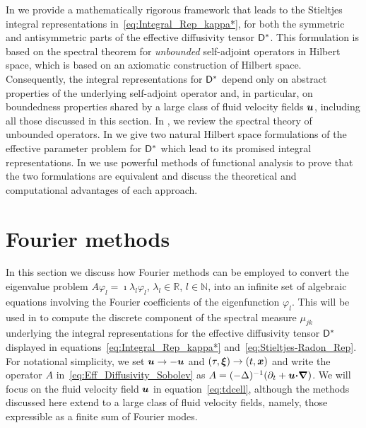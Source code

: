 \documentclass[amsa]{ipart}
\begin{document}
In  we provide a mathematically rigorous
framework that leads to the Stieltjes integral representations
in~\eqref{eq:Integral_Rep_kappa*}, for both the symmetric and
antisymmetric parts of the effective diffusivity tensor $\mathsf{D}^*$. This
formulation is based on the spectral theorem for 
\emph{unbounded} self-adjoint operators in  Hilbert space, which is
based on an axiomatic construction of Hilbert 
space. Consequently, the integral representations for $\mathsf{D}^*$ depend
only on abstract properties of the underlying self-adjoint operator
and, in particular, on boundedness properties shared by a large
class of fluid velocity fields $\boldsymbol{u}$, including all those
discussed in this section. In , we
review the spectral theory of unbounded operators. In 
 we give two natural
Hilbert space formulations of the effective parameter problem for
$\mathsf{D}^*$ which lead to its promised integral representations. In
 we use powerful methods of
functional analysis to prove that the two formulations are equivalent
and discuss the theoretical and computational advantages of each
approach.  



  
\section{Fourier methods}
\label{sec:Fourier_Methods} 
%
In this section we discuss how Fourier methods can be employed to
convert the eigenvalue problem $A\varphi_l=\imath\lambda_l\varphi_l$, $\lambda_l\in\mathbb{R}$,
$l\in\mathbb{N}$, into an infinite set of algebraic equations involving
the Fourier coefficients of the eigenfunction $\varphi_l$. This will be used
in  to compute the discrete component of the
spectral measure $\mu_{jk}$ underlying the integral representations for
the effective diffusivity tensor $\mathsf{D}^*$ displayed in
equations~\eqref{eq:Integral_Rep_kappa*}
and~\eqref{eq:Stieltjes-Radon_Rep}.  For notational simplicity, we set
$\boldsymbol{u}\to-\boldsymbol{u}$ and $(\tau,\boldsymbol{\xi})\to(t,\boldsymbol{x})$ and write the operator $A$
in~\eqref{eq:Eff_Diffusivity_Sobolev} as
$A=(-\Delta)^{-1}(\partial_t+\boldsymbol{u}\mbox{\boldmath${\cdot}$}\mbox{\boldmath${\nabla}$})$. We will focus on the fluid
velocity field $\boldsymbol{u}$ in equation~\eqref{eq:tdcell}, although the methods
discussed here extend to a large class of fluid velocity fields,
namely, those expressible as a finite sum of Fourier modes.
\end{document}
